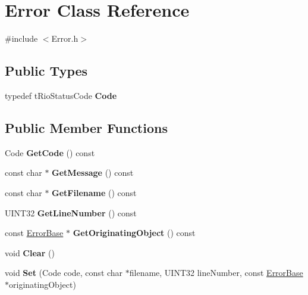 \hypertarget{classError}{\section{\-Error \-Class \-Reference}
\label{classError}
}


{\ttfamily \#include $<$\-Error.\-h$>$}

\subsection*{\-Public \-Types}
\begin{DoxyCompactItemize}
\item 
\hypertarget{classError_ad0ca95bfda335aaedd0d6c5c52b5d95b}{typedef t\-Rio\-Status\-Code {\bfseries \-Code}}\label{classError_ad0ca95bfda335aaedd0d6c5c52b5d95b}

\end{DoxyCompactItemize}
\subsection*{\-Public \-Member \-Functions}
\begin{DoxyCompactItemize}
\item 
\hypertarget{classError_aac48d824bf56f26e5c213f0f7454ec99}{\-Code {\bfseries \-Get\-Code} () const }\label{classError_aac48d824bf56f26e5c213f0f7454ec99}

\item 
\hypertarget{classError_a706aa3025b0d2b1430f503a7b3a3b713}{const char $\ast$ {\bfseries \-Get\-Message} () const }\label{classError_a706aa3025b0d2b1430f503a7b3a3b713}

\item 
\hypertarget{classError_a1ecbf12fe24dac6f4c00da7895a4ff2f}{const char $\ast$ {\bfseries \-Get\-Filename} () const }\label{classError_a1ecbf12fe24dac6f4c00da7895a4ff2f}

\item 
\hypertarget{classError_abf8a3ba03ce42ad1a04caa5c2e6cf84a}{\-U\-I\-N\-T32 {\bfseries \-Get\-Line\-Number} () const }\label{classError_abf8a3ba03ce42ad1a04caa5c2e6cf84a}

\item 
\hypertarget{classError_ac3a8fe161c7baad22e7da65389892a3c}{const \hyperlink{classErrorBase}{\-Error\-Base} $\ast$ {\bfseries \-Get\-Originating\-Object} () const }\label{classError_ac3a8fe161c7baad22e7da65389892a3c}

\item 
\hypertarget{classError_afd919c7b9e33c2e630edee8072c31922}{void {\bfseries \-Clear} ()}\label{classError_afd919c7b9e33c2e630edee8072c31922}

\item 
\hypertarget{classError_ab06aa51c2d0b1a2c2178bdc69c0fa1d3}{void {\bfseries \-Set} (\-Code code, const char $\ast$filename, \-U\-I\-N\-T32 line\-Number, const \hyperlink{classErrorBase}{\-Error\-Base} $\ast$originating\-Object)}\label{classError_ab06aa51c2d0b1a2c2178bdc69c0fa1d3}

\end{DoxyCompactItemize}


